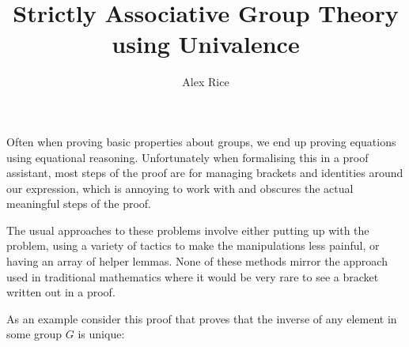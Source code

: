 \documentclass{article}
\title{Strictly Associative Group Theory using Univalence}
\author{Alex Rice}
\begin{document}
\maketitle

Often when proving basic properties about groups, we end up proving equations using equational reasoning. Unfortunately when formalising this in a proof assistant, most steps of the proof are for managing brackets and identities around our expression, which is annoying to work with and obscures the actual meaningful steps of the proof.

The usual approaches to these problems involve either putting up with the problem, using a variety of tactics to make the manipulations less painful, or having an array of helper lemmas. None of these methods mirror the approach used in traditional mathematics where it would be very rare to see a bracket written out in a proof.

As an example consider this proof that proves that the inverse of any element in some group \(G\) is unique:

\begin{code}[hide]%
\>[0]\AgdaSpace{}%
\AgdaSpace{}%
\<%
\\
\>[0]\AgdaSpace{}%
\AgdaSpace{}%
\<%
\\
\>[0]\AgdaSpace{}%
\AgdaSpace{}%
\<%
\\
\>[0]\AgdaSpace{}%
\AgdaSpace{}%
\<%
\\
\>[0]\AgdaSpace{}%
\AgdaSpace{}%
\<%
\\
\>[0]\AgdaSpace{}%
\AgdaSpace{}%
\<%
\end{code}
\end{document}
